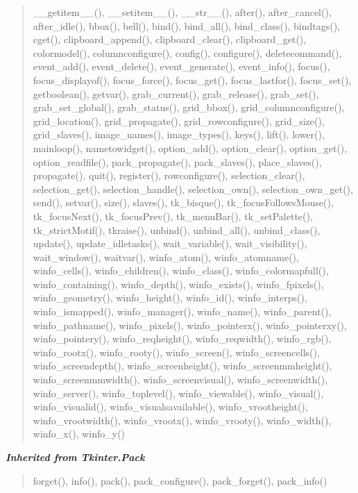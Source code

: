 \begin{quote}
\_\_getitem\_\_(), \_\_setitem\_\_(), \_\_str\_\_(), after(), after\_cancel(), after\_idle(), bbox(), bell(), bind(), bind\_all(), bind\_class(), bindtags(), cget(), clipboard\_append(), clipboard\_clear(), clipboard\_get(), colormodel(), columnconfigure(), config(), configure(), deletecommand(), event\_add(), event\_delete(), event\_generate(), event\_info(), focus(), focus\_displayof(), focus\_force(), focus\_get(), focus\_lastfor(), focus\_set(), getboolean(), getvar(), grab\_current(), grab\_release(), grab\_set(), grab\_set\_global(), grab\_status(), grid\_bbox(), grid\_columnconfigure(), grid\_location(), grid\_propagate(), grid\_rowconfigure(), grid\_size(), grid\_slaves(), image\_names(), image\_types(), keys(), lift(), lower(), mainloop(), nametowidget(), option\_add(), option\_clear(), option\_get(), option\_readfile(), pack\_propagate(), pack\_slaves(), place\_slaves(), propagate(), quit(), register(), rowconfigure(), selection\_clear(), selection\_get(), selection\_handle(), selection\_own(), selection\_own\_get(), send(), setvar(), size(), slaves(), tk\_bisque(), tk\_focusFollowsMouse(), tk\_focusNext(), tk\_focusPrev(), tk\_menuBar(), tk\_setPalette(), tk\_strictMotif(), tkraise(), unbind(), unbind\_all(), unbind\_class(), update(), update\_idletasks(), wait\_variable(), wait\_visibility(), wait\_window(), waitvar(), winfo\_atom(), winfo\_atomname(), winfo\_cells(), winfo\_children(), winfo\_class(), winfo\_colormapfull(), winfo\_containing(), winfo\_depth(), winfo\_exists(), winfo\_fpixels(), winfo\_geometry(), winfo\_height(), winfo\_id(), winfo\_interps(), winfo\_ismapped(), winfo\_manager(), winfo\_name(), winfo\_parent(), winfo\_pathname(), winfo\_pixels(), winfo\_pointerx(), winfo\_pointerxy(), winfo\_pointery(), winfo\_reqheight(), winfo\_reqwidth(), winfo\_rgb(), winfo\_rootx(), winfo\_rooty(), winfo\_screen(), winfo\_screencells(), winfo\_screendepth(), winfo\_screenheight(), winfo\_screenmmheight(), winfo\_screenmmwidth(), winfo\_screenvisual(), winfo\_screenwidth(), winfo\_server(), winfo\_toplevel(), winfo\_viewable(), winfo\_visual(), winfo\_visualid(), winfo\_visualsavailable(), winfo\_vrootheight(), winfo\_vrootwidth(), winfo\_vrootx(), winfo\_vrooty(), winfo\_width(), winfo\_x(), winfo\_y()
\end{quote}

\large{\textbf{\textit{Inherited from Tkinter.Pack}}}

\begin{quote}
forget(), info(), pack(), pack\_configure(), pack\_forget(), pack\_info()
\end{quote}

